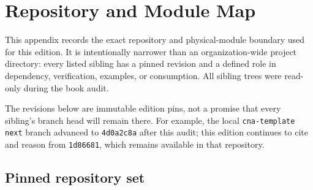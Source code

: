 \chapter{Repository and Module Map}
\label{ch:repo-map}

This appendix records the exact repository and physical-module boundary used for this edition.
It is intentionally narrower than an organization-wide project directory: every listed sibling
has a pinned revision and a defined role in dependency, verification, examples, or consumption.
All sibling trees were read-only during the book audit.

The revisions below are immutable edition pins, not a promise that every sibling's branch head
will remain there.  For example, the local \texttt{cna-template} \texttt{next} branch advanced to
\texttt{4d0a2c8a} after this audit; this edition continues to cite and reason from
\texttt{1d86681}, which remains available in that repository.

\section{Pinned repository set}

